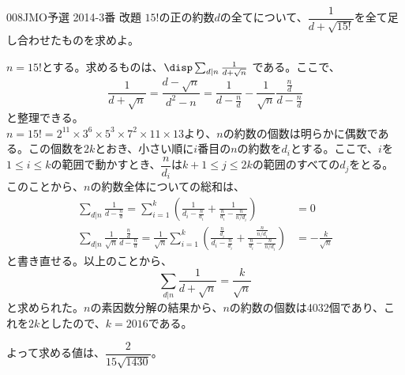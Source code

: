 \begin{prob}{008}{}{JMO予選 2014-3番 改題}
 $15!$の正の約数$d$の全てについて、$\dfrac{1}{d+\sqrt{15!}}$を全て足し合わせたものを求めよ。
\end{prob}
$n=15!$とする。求めるものは、$\disp \sum_{d|n}\frac{1}{d+\sqrt{n}}$ である。ここで、
\[ \frac{1}{d+\sqrt{n}} = \frac{d-\sqrt{n}}{d^2-n} = \frac{1}{d-\frac{n}{d}}-\frac{1}{\sqrt{n}}\frac{\frac{n}{d}}{d-\frac{n}{d}} \]
と整理できる。\\
$n=15!=2^{11}\times 3^6\times 5^3\times 7^2\times 11\times 13$より、$n$の約数の個数は明らかに偶数である。この個数を$2k$とおき、小さい順に$i$番目の$n$の約数を$d_i$とする。ここで、$i$を$1\le i \le k$の範囲で動かすとき、$\dfrac{n}{d_i}$は$k+1\le j \le 2k$の範囲のすべての$d_j$をとる。このことから、$n$の約数全体についての総和は、
\begin{align*}
 \sum_{d|n} \frac{1}{d-\frac{n}{d}}=\sum_{i=1}^k \left(\frac{1}{d_i-\frac{n}{d_i}}+\frac{1}{\frac{n}{d_i}-\frac{n}{n/d_i}}\right) &= 0 \\
 \sum_{d|n} \frac{1}{\sqrt{n}}\frac{\frac{n}{d}}{d-\frac{n}{d}} = \frac{1}{\sqrt{n}} \sum_{i=1}^k \left(\frac{\frac{n}{d_i}}{d_i-\frac{n}{d_i}} + \frac{\frac{n}{n/d_i}}{\frac{n}{d_i}-\frac{n}{n/d_i}}\right) &= -\frac{k}{\sqrt{n}} 
\end{align*}
と書き直せる。以上のことから、
\[ \sum_{d|n}\frac{1}{d+\sqrt{n}} = \frac{k}{\sqrt{n}} \]
と求められた。$n$の素因数分解の結果から、$n$の約数の個数は4032個であり、これを$2k$としたので、$k=2016$である。

よって求める値は、\textbf{$\dfrac{2}{15\sqrt{1430}}$}。